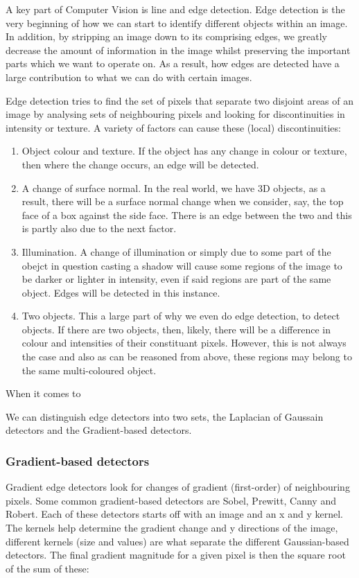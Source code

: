 \documentclass[11pt]{article}
\begin{document}
A key part of Computer Vision is line and edge detection. Edge detection is
the very beginning of how we can start to identify different objects 
within an image. In addition, by stripping an image down to its comprising
edges, we greatly decrease the amount of information in the image whilst
preserving the important parts which we want to operate on. 
As a result, how edges are detected have a large contribution
to what we can do with certain images.  

Edge detection tries to find the set of pixels that separate two 
disjoint areas of an image by analysing sets of neighbouring pixels and 
looking for discontinuities in intensity or texture. A variety of factors
can cause these (local) discontinuities:
\begin{enumerate}
	\item Object colour and texture. If the object has any change in colour or
		  texture, then where the change occurs, an edge will be detected.
	\item A change of surface normal. In the real world, we have 3D objects,
		  as a result, there will be a surface normal change when we consider,
		  say, the top face of a box against the side face. There is an edge
		  between the two and this is partly also due to the next factor.
	\item Illumination. A change of illumination or simply due to some
		  part of the obejct in question casting a shadow will cause some regions
		  of the image to be darker or lighter in intensity, even if said
		  regions are part of the same object. Edges will be detected in this
		  instance.
	\item Two objects. This a large part of why we even do edge detection, to
		  detect objects. If there are two objects, then, likely, there will be
		  a difference in colour and intensities of their constituant pixels.
		  However, this is not always the case and also as can be reasoned from
		  above, these regions may belong to the same multi-coloured object.
\end{enumerate}

When it comes to 

We can distinguish edge detectors into two sets, the Laplacian of Gaussain detectors
and the Gradient-based detectors.

\subsubsection{Gradient-based detectors}
Gradient edge detectors look for changes of gradient (first-order) of 
neighbouring pixels. Some common gradient-based detectors are Sobel,
Prewitt, Canny and Robert. Each of these detectors starts off with an image
and an x and y kernel. The kernels help determine the gradient change
and y directions of the image, different kernels (size and values) are what
separate the different Gaussian-based detectors. The final gradient magnitude
for a given pixel is then the square root of the sum of these: 
\end{document}
